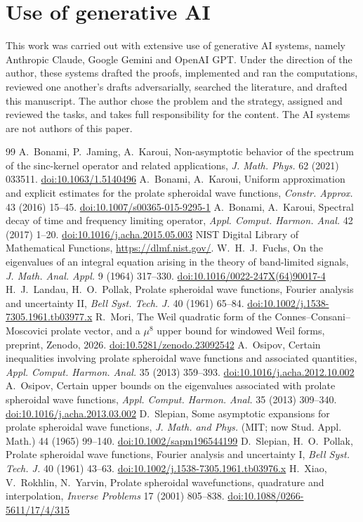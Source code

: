 \documentclass[11pt]{amsart}
\newcommand{\doi}[1]{\href{https://doi.org/#1}{doi:#1}}
\theoremstyle{remark}
\numberwithin{equation}{section}
\begin{document}
\section*{Use of generative AI}
This work was carried out with extensive use of generative AI systems, namely Anthropic Claude, Google Gemini and OpenAI GPT. Under the direction of the author, these systems drafted the proofs, implemented and ran the computations, reviewed one another's drafts adversarially, searched the literature, and drafted this manuscript. The author chose the problem and the strategy, assigned and reviewed the tasks, and takes full responsibility for the content. The AI systems are not authors of this paper.

\begin{thebibliography}{99}
 A.~Bonami, P.~Jaming, A.~Karoui, Non-asymptotic behavior of the spectrum of the sinc-kernel operator and related applications, \emph{J. Math. Phys.} 62 (2021) 033511. \doi{10.1063/1.5140496}
 A.~Bonami, A.~Karoui, Uniform approximation and explicit estimates for the prolate spheroidal wave functions, \emph{Constr. Approx.} 43 (2016) 15--45. \doi{10.1007/s00365-015-9295-1}
 A.~Bonami, A.~Karoui, Spectral decay of time and frequency limiting operator, \emph{Appl. Comput. Harmon. Anal.} 42 (2017) 1--20. \doi{10.1016/j.acha.2015.05.003}
 NIST Digital Library of Mathematical Functions, \url{https://dlmf.nist.gov/}.
 W.~H.~J.~Fuchs, On the eigenvalues of an integral equation arising in the theory of band-limited signals, \emph{J. Math. Anal. Appl.} 9 (1964) 317--330. \doi{10.1016/0022-247X(64)90017-4}
 H.~J.~Landau, H.~O.~Pollak, Prolate spheroidal wave functions, Fourier analysis and uncertainty II, \emph{Bell Syst. Tech. J.} 40 (1961) 65--84. \doi{10.1002/j.1538-7305.1961.tb03977.x}
 R.~Mori, The Weil quadratic form of the Connes--Consani--Moscovici prolate vector, and a $\mu^8$ upper bound for windowed Weil forms, preprint, Zenodo, 2026. \doi{10.5281/zenodo.23092542}
 A.~Osipov, Certain inequalities involving prolate spheroidal wave functions and associated quantities, \emph{Appl. Comput. Harmon. Anal.} 35 (2013) 359--393. \doi{10.1016/j.acha.2012.10.002}
 A.~Osipov, Certain upper bounds on the eigenvalues associated with prolate spheroidal wave functions, \emph{Appl. Comput. Harmon. Anal.} 35 (2013) 309--340. \doi{10.1016/j.acha.2013.03.002}
 D.~Slepian, Some asymptotic expansions for prolate spheroidal wave functions, \emph{J. Math. and Phys.} (MIT; now Stud. Appl. Math.) 44 (1965) 99--140. \doi{10.1002/sapm196544199}
 D.~Slepian, H.~O.~Pollak, Prolate spheroidal wave functions, Fourier analysis and uncertainty I, \emph{Bell Syst. Tech. J.} 40 (1961) 43--63. \doi{10.1002/j.1538-7305.1961.tb03976.x}
 H.~Xiao, V.~Rokhlin, N.~Yarvin, Prolate spheroidal wavefunctions, quadrature and interpolation, \emph{Inverse Problems} 17 (2001) 805--838. \doi{10.1088/0266-5611/17/4/315}
\end{thebibliography}
\end{document}

